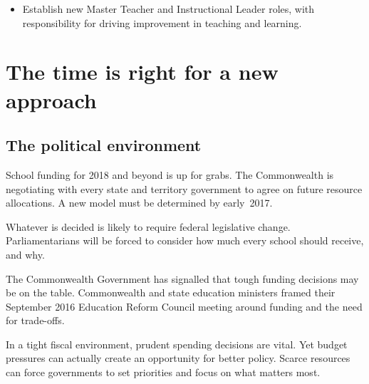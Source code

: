 \documentclass{grattan}
\begin{document}
\label{rec:recommendation-3-re-direct-the-savings-to-invest-in-highly-skilled-teachers-to-lift-the-effectiveness-of-the-workforce}
\begin{itemize}
    \item Establish new Master Teacher and Instructional Leader roles, with responsibility for driving improvement in teaching and learning.
\end{itemize}



\contentspage
\listoffigures

\chapter{The time is right for a new approach }\label{chap:the-time-is-right-for-a-new-approach}

\section{The political environment}\label{sec:the-political-environment}
School funding for 2018 and beyond is up for grabs.
The Commonwealth is negotiating with every state and territory government to agree on future resource allocations.
A new model must be determined by early~2017.

Whatever is decided is likely to require federal legislative change.
Parliamentarians will be forced to consider how much every school should receive, and why.

The Commonwealth Government has signalled that tough funding decisions may be on the table.
Commonwealth and state education ministers framed their September 2016 Education Reform Council meeting around funding and the need for trade-offs.

In a tight fiscal environment, prudent spending decisions are vital.
Yet budget pressures can actually create an opportunity for better policy.
Scarce resources can force governments to set priorities and focus on what matters most.
\end{document}
